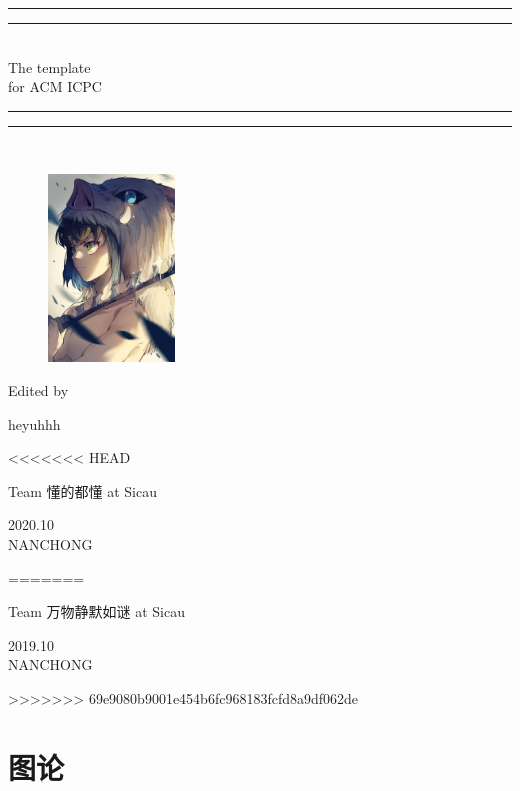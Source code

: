 \documentclass[a4paper,11pt,twoside,fontset = fandol,UTF8]{ctexbook} %
\begin{document}
 
	\begin{titlepage}       %
		\centering
		\vspace*{\baselineskip}
		\rule{\textwidth}{1.6pt}\vspace*{-\baselineskip}\vspace*{2pt}
		\rule{\textwidth}{0.4pt}\\[\baselineskip]
		{\LARGE The template\\[\baselineskip]\small for ACM ICPC}
		\\[0.2\baselineskip]
		\rule{\textwidth}{0.4pt}\vspace*{-\baselineskip}\vspace{3.2pt}
		\rule{\textwidth}{1.6pt}\\[\baselineskip]
		\scshape
		
		\begin{figure}[!htb]
			\centering
			\includegraphics[width=0.3\textwidth]{icpc}    %
		\end{figure}
		
		\vspace*{3\baselineskip}
		Edited by \\[\baselineskip] {heyuhhh\par}
<<<<<<< HEAD
		{Team \Large 懂的都懂 \normalsize{at Sicau}\par }
		\vfill
		{\scshape 2020.10} \\{\large NANCHONG}\par
=======
		{Team \Large 万物静默如谜 \normalsize{at Sicau}\par }
		\vfill
		{\scshape 2019.10} \\{\large NANCHONG}\par
>>>>>>> 69e9080b9001e454b6fc968183fcfd8a9df062de
	\end{titlepage}
	\newpage            %
	\tableofcontents     %
	\chapter{图论}    %
	\setcounter{page}{1} %
\end{document}
